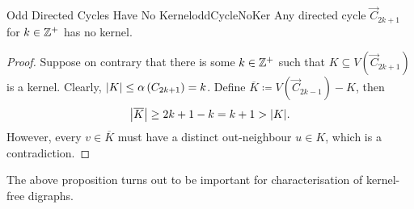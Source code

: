 \documentclass[math, code]{amznotes}
\theoremstyle{remark}
\begin{document}
\begin{probox}{Odd Directed Cycles Have No Kernel}{oddCycleNoKer}
    Any directed cycle $\overrightarrow{C}_{2k + 1}$ for $k \in \mathbb{Z}^+$ has no kernel.
    \tcblower
    \begin{proof}
        Suppose on contrary that there is some $k \in \mathbb{Z}^+$ such that $K \subseteq V\left(\overrightarrow{C}_{2k + 1}\right)$ is a kernel. Clearly, ${\left\lvert {K} \right\rvert} \leq \alpha\left(C_{2k + 1}\right) = k$. Define $\overline{K} \coloneqq V\left(\overrightarrow{C}_{2k - 1}\right) - K$, then 
        \begin{equation*}
            {\left\lvert {\overline{K}} \right\rvert} \geq 2k + 1 - k = k + 1 > {\left\lvert {K} \right\rvert}.
        \end{equation*}
        However, every $v \in \overline{K}$ must have a distinct out-neighbour $u \in K$, which is a contradiction.
    \end{proof}
\end{probox}
The above proposition turns out to be important for characterisation of kernel-free digraphs.
\end{document}
